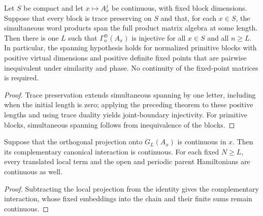 \begin{lemma}
    \label{thm:compact_block_boundary_injectivity}
    \leanok

    Let $S$ be compact and let $x\mapsto A_x^j$ be continuous, with fixed
    block dimensions. Suppose that every block is trace preserving on $S$
    and that, for each $x\in S$, the simultaneous word products span the
    full product matrix algebra at some length. Then there is one $L$
    such that $\Gamma_n^{\oplus}(A_x)$ is injective for all $x\in S$ and
    all $n\geq L$.
    In particular, the spanning hypothesis holds for normalized primitive
    blocks with positive virtual dimensions and positive definite fixed points
    that are pairwise
    inequivalent under similarity and phase. No continuity of the
    fixed-point matrices is required.
\end{lemma}
\begin{proof}
    \leanok
    Trace preservation extends simultaneous spanning by one letter,
    including when the initial length is zero; applying the preceding
    theorem to these positive lengths and using trace duality yields
    joint-boundary injectivity. For primitive blocks, simultaneous spanning
    follows from inequivalence of the blocks.
\end{proof}

\begin{lemma}
    \label{thm:finite_window_continuity_from_ground_projection}
    \leanok
    Suppose that the orthogonal projection onto $G_L(A_x)$ is continuous
    in $x$. Then its complementary canonical interaction is continuous.
    For each fixed $N\geq L$, every translated local term and the open
    and periodic parent Hamiltonians are continuous as well.
\end{lemma}
\begin{proof}
    \leanok
    Subtracting the local projection from the identity gives the complementary
    interaction, whose fixed embeddings into the chain and their finite sums
    remain continuous.
\end{proof}

